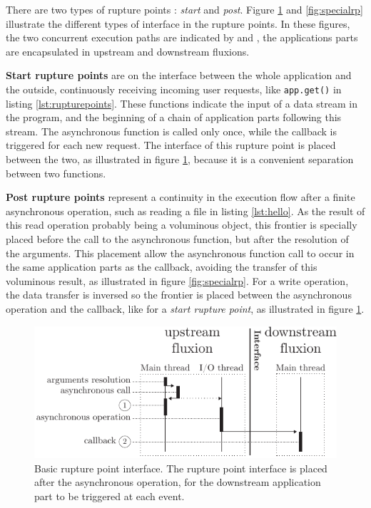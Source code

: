 There are two types of rupture points : \textit{start} and \textit{post}.
Figure \ref{fig:basicrp} and \ref{fig:specialrp} illustrate the different types of interface in the rupture points.
In these figures, the two concurrent execution paths are indicated by  and , the applications parts are encapsulated in upstream and downstream fluxions.

\textbf{Start rupture points} are on the interface between the whole application and the outside, continuously receiving incoming user requests, like \texttt{app.get()} in listing \ref{lst:rupturepoints}.
These functions indicate the input of a data stream in the program, and the beginning of a chain of application parts following this stream.
The asynchronous function is called only once, while the callback is triggered for each new request.
The interface of this rupture point is placed between the two, as illustrated in figure \ref{fig:basicrp}, because it is a convenient separation between two functions.

\textbf{Post rupture points} represent a continuity in the execution flow after a finite asynchronous operation, such as reading a file in listing \ref{lst:hello}.
As the result of this read operation probably being a voluminous object, this frontier is specially placed before the call to the asynchronous function, but after the resolution of the arguments.
This placement allow the asynchronous function call to occur in the same application parts as the callback, avoiding the transfer of this voluminous result, as illustrated in figure \ref{fig:specialrp}.
For a write operation, the data transfer is inversed so the frontier is placed between the asynchronous operation and the callback, like for a \textit{start rupture point}, as illustrated in figure \ref{fig:basicrp}.

\begin{figure}[h!]
\begin{center}
  \includegraphics[width=\linewidth]{ressources/basicrp.pdf}
  \caption{Basic rupture point interface. \textnormal{The rupture point interface is placed after the asynchronous operation, for the downstream application part to be triggered at each event.}}
  \label{fig:basicrp}
\end{center}
\end{figure}

